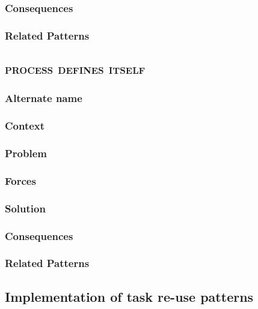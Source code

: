 \documentclass[prodmode]{style/acmlarge}
\begin{document}
\subsubsection*{Consequences}

\subsubsection*{Related Patterns}



\subsection{\textsc{\textbf{process defines itself}}}

\subsubsection*{Alternate name}

\subsubsection*{Context}

\subsubsection*{Problem}

\subsubsection*{Forces}

\subsubsection*{Solution}

\subsubsection*{Consequences}

\subsubsection*{Related Patterns}



\subsection{Implementation of task re-use patterns}
\end{document}
